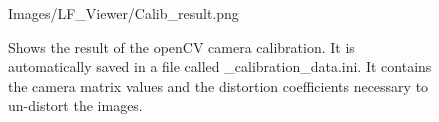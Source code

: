\begin{figure}[htb]
	\begin{minipage}[h]{\textwidth}
		\centering
		\begin{overpic}[width=0.9\linewidth]{Images/LF_Viewer/Calib_result.png}
		\end{overpic}
	\end{minipage}
	\caption{Shows the result of the openCV camera calibration. It is automatically saved in a file called \_calibration\_data.ini. It contains the camera matrix values and the distortion coefficients necessary to un-distort the images.}
	\label{figure_calib_result}
\end{figure}
